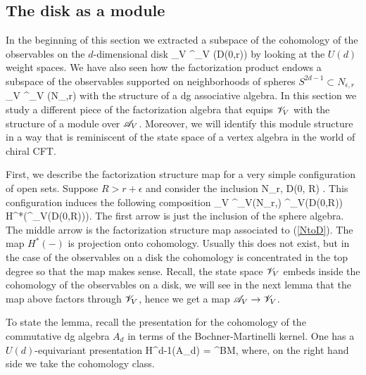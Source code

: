 \subsection{The disk as a module}
In the beginning of this section we extracted a subspace of the cohomology of the observables on the $d$-dimensional disk 
\ben
\sV_V \subset \Obs^{\q}_{V} (D(0,r))
\een
by looking at the $U(d)$ weight spaces. 
We have also seen how the factorization product endows a subspace of the observables supported on neighborhoods of spheres $S^{2d-1} \subset N_{\epsilon, r}$
\ben
\sA_V \subset \Obs^\q_V (N_{\epsilon,r})
\een
with the structure of a dg associative algebra.
In this section we study a different piece of the factorization algebra that equips $\mathscr V_V$ with the structure of a module over $\mathscr A_V$. 
Moreover, we will identify this module structure in a way that is reminiscent of the state space of a vertex algebra in the world of chiral CFT.

First, we describe the factorization structure map for a very simple configuration of open sets. 
Suppose $R > r + \epsilon$ and consider the inclusion 
\be\label{NtoD}
N_{r,\epsilon} \hookrightarrow D(0, R) .
\ee
This configuration induces the following composition
\be\label{composition1}
\sA_V \hookrightarrow \Obs^\q_V(N_{r,\epsilon}) \to \Obs^\q_V(D(0,R))  H^*\left(\Obs^\q_V(D(0,R))\right).
\ee
The first arrow is just the inclusion of the sphere algebra.
The middle arrow is the factorization structure map associated to (\ref{NtoD}).
The map $H^*(-)$ is projection onto cohomology.
Usually this does not exist, but in the case of the observables on a disk the cohomology is concentrated in the top degree so that the map makes sense.
Recall, the state space $\mathscr V_V$ embeds inside the cohomology of the observables on a disk, we will see in the next lemma that the map above factors through $\mathscr V_V$, hence we get a map $\mathscr A_V \to \mathscr V_V$.

To state the lemma, recall the presentation for the cohomology of the commutative dg algebra $A_d$ in terms of the Bochner-Martinelli kernel.
One has a $U(d)$-equivariant presentation
\ben
H^{d-1}(A_d) = \CC{} \omega^{BM},
\een
where, on the right hand side we take the cohomology class.

